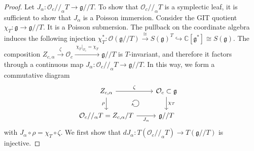 \documentclass[11pt,reqno]{amsart}
\newtheorem*{theorem A}{Main Theorem A}
\newtheorem*{theorem B}{Main Theorem B}
\newtheorem*{theorem C}{Main Theorem C}
\newtheorem*{theorem D}{Main Theorem D}
\theoremstyle{definition}
\theoremstyle{plain}
\theoremstyle{conclusion}
\begin{document}
\begin{proof}
Let $J_\alpha:\mathcal{O}_c//_\alpha T \rightarrow  \mathfrak{g}//T$. To show that $\mathcal{O}_c//_\alpha T $ is a symplectic leaf, it is sufficient to show that $J_\alpha$ is a Poisson immersion. Consider the GIT quotient $\chi_T: \mathfrak{g} \rightarrow \mathfrak{g}//T$. It is a Poisson submersion. The pullback on the coordinate algebra induces the following injection $\chi_T^*:\mathcal{O}(\mathfrak{g}//T) \xrightarrow{ \ \cong \ }S(\mathfrak{g})^T \hookrightarrow \mathbb{C}[\mathfrak{g}^*] \cong S(\mathfrak{g}) $. The composition  $  Z_{c,\alpha} \xrightarrow{\ \zeta \ } \mathcal{O}_c \xrightarrow{ \ \chi_T\vert_{\mathcal{O}_c} = \chi_T \ }   \mathfrak{g}//T$ is $T$-invariant, and therefore it factors through a continuous map $J_\alpha: \mathcal{O}_c//_\alpha T\rightarrow \mathfrak{g}//T$. In this way, we form a commutative diagram %
\[\begin{tikzcd}
	{Z_{c,\alpha}} & {\mathcal{O}_c \subset \mathfrak{g}} \\
	{\mathcal{O}_c//_\alpha T = Z_{c,\alpha}/T} & {\mathfrak{g}//T}
	\arrow["\zeta", from=1-1, to=1-2]
	\arrow["\rho"', from=1-1, to=2-1]
	\arrow["{ \chi_T}", from=1-2, to=2-2]
	\arrow["{J_\alpha}"', from=2-1, to=2-2]
    \arrow[from=1-1, to=2-2, phantom, "\circlearrowright" {anchor=center, scale=1.5, rotate=90}]
\end{tikzcd}\]with $J_\alpha \circ \rho = \chi_T \circ \zeta$. %
We first show that $dJ_\alpha : T\left(\mathcal{O}_c//_\alpha T\right) \rightarrow T\left(\mathfrak{g}//T\right)$ is injective. %

\end{proof}
\end{document}
